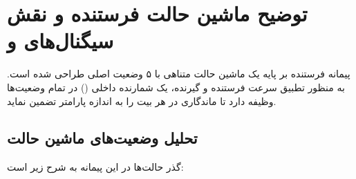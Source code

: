 \section{توضیح ماشین حالت فرستنده و نقش سیگنال‌های  و }
پیمانه فرستنده بر پایه یک ماشین حالت متناهی با ۵ وضعیت اصلی طراحی شده است. به منظور تطبیق سرعت فرستنده و گیرنده، یک شمارنده داخلی () در تمام وضعیت‌ها وظیفه دارد تا ماندگاری در هر بیت را به اندازه پارامتر  تضمین نماید.

\subsection{تحلیل وضعیت‌های ماشین حالت}
گذر حالت‌ها در این پیمانه به شرح زیر است:




